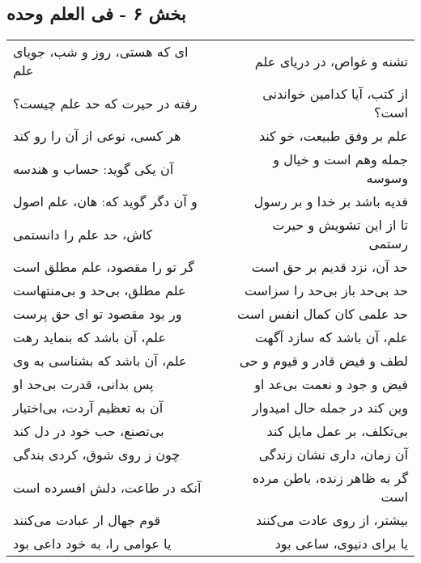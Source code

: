 \begin{center}
\section*{بخش ۶ - فی العلم وحده}
\label{sec:006}
\begin{longtable}{l p{0.5cm} r}
ای که هستی، روز و شب، جویای علم
&&
تشنه و غواص، در دریای علم
\\
رفته در حیرت که حد علم چیست؟
&&
از کتب، آیا کدامین خواندنی است؟
\\
هر کسی، نوعی از آن را رو کند
&&
علم بر وفق طبیعت، خو کند
\\
آن یکی گوید: حساب و هندسه
&&
جمله وهم است و خیال و وسوسه
\\
و آن دگر گوید که: هان، علم اصول
&&
فدیه باشد بر خدا و بر رسول
\\
کاش، حد علم را دانستمی
&&
تا از این تشویش و حیرت رستمی
\\
گر تو را مقصود، علم مطلق است
&&
حد آن، نزد قدیم بر حق است
\\
علم مطلق، بی‌حد و بی‌منتهاست
&&
حد بی‌حد باز بی‌حد را سزاست
\\
ور بود مقصود تو ای حق پرست
&&
حد علمی کان کمال انفس است
\\
علم، آن باشد که بنماید رهت
&&
علم، آن باشد که سازد آگهت
\\
علم، آن باشد که بشناسی به وی
&&
لطف و فیض قادر و قیوم و حی
\\
پس بدانی، قدرت بی‌حد او
&&
فیض و جود و نعمت بی‌عد او
\\
آن به تعظیم آردت، بی‌اختیار
&&
وین کند در جمله حال امیدوار
\\
بی‌تصنع، حب خود در دل کند
&&
بی‌تکلف، بر عمل مایل کند
\\
چون ز روی شوق، کردی بندگی
&&
آن زمان، داری نشان زندگی
\\
آنکه در طاعت، دلش افسرده است
&&
گر به ظاهر زنده، باطن مرده است
\\
قوم جهال ار عبادت می‌کنند
&&
بیشتر، از روی عادت می‌کنند
\\
یا عوامی را، به خود داعی بود
&&
یا برای دنیوی، ساعی بود
\\
\end{longtable}
\end{center}
